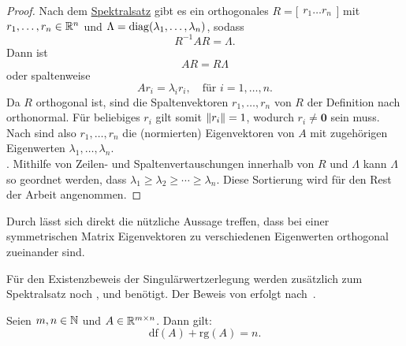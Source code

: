 \begin{proof}
    Nach dem \hyperref[spec]{Spektralsatz} gibt es ein orthogonales 
    \(
    R=
    \big[
    \begin{matrix}
        r_1 \dots r_n
    \end{matrix}
    \big]
    \)
    mit
    \(r_1,\ldots,r_n \in \mathbb{R}^{n}\) 
    und 
    \(\Lambda = \operatorname{diag}(\lambda_1,\ldots,\lambda_n)\), sodass
    \begin{equation*}
        R^{-1}AR = \Lambda.
    \end{equation*}
    Dann ist
    \begin{equation*}
        AR = R\Lambda
    \end{equation*} 
    oder spaltenweise
    \begin{equation*}
        Ar_i = {\lambda}_i r_i, \quad \text{für } i = 1,\ldots,n.
    \end{equation*}
    Da \(R\) orthogonal ist, sind die Spaltenvektoren \(r_1,\ldots,r_n\) von \(R\) der Definition nach orthonormal.
    Für beliebiges \(r_i\) gilt somit \(\lVert r_i\rVert = 1\), wodurch \(r_i \neq \symbf{0}\) sein muss.
    Nach  sind also \(r_1,\ldots,r_n\) die (normierten) Eigenvektoren von \(A\) mit zugehörigen Eigenwerten \(\lambda_1,\ldots,\lambda_n\).\vspace{6pt}\\
    . Mithilfe von Zeilen- und Spaltenvertauschungen innerhalb von \(R\) und \(\Lambda\) kann \(\Lambda\) so geordnet werden, dass \(\lambda_1 \geq \lambda_2 \geq \cdots \geq \lambda_n\).
Diese Sortierung wird für den Rest der Arbeit angenommen.
\end{proof}
\begin{remark}\label{rem:orth}
    Durch  lässt sich direkt die nützliche Aussage treffen, dass bei einer symmetrischen Matrix Eigenvektoren zu verschiedenen Eigenwerten orthogonal zueinander sind. 
\end{remark}
Für den Existenzbeweis der Singulärwertzerlegung werden zusätzlich zum Spektralsatz noch ,  und  benötigt.
Der Beweis von  erfolgt nach~\cite{cheruvilthomasAnswerWhyDoes2013}.
\begin{repitition}[Dimensionssatz]\label{rep:dim}
    Seien \(m,n \in \mathbb{N}\) und \(A \in \mathbb{R}^{m \times n}\). Dann gilt:
    \begin{equation*}
        \text{df}(A) + \text{rg}(A) = n.
    \end{equation*} 
\end{repitition}

